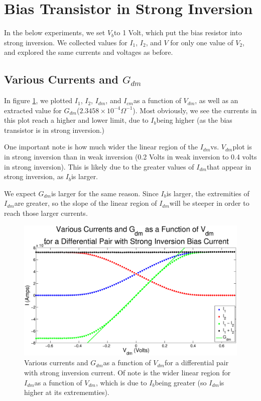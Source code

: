 \documentclass{article}
\newcommand{\Vb}{{$V_{b}$}}
\newcommand{\Vtwo}{{$V_{2}$}}
\newcommand{\Itwo}{{$I_{2}$}}
\newcommand{\Ione}{{$I_{1}$}}
\newcommand{\gdm}{{$G_{dm}$}}
\newcommand{\Vdm}{{$V_{dm}$}}
\newcommand{\Idm}{{$I_{dm}$}}
\newcommand{\Icm}{{$I_{cm}$}}
\newcommand{\Ib}{{$I_{b}$}}
\begin{document}
\section*{Bias Transistor in Strong Inversion}

In the below experiments, we set \Vb to 1 Volt, which put the bias resistor into strong inversion. We collected values for \Ione, \Itwo, and $V$ for only one value of \Vtwo, and explored the same currents and voltages as before.

\subsection*{Various Currents and \gdm}

In figure \ref{fig:AllCurrentsStrongInversion}, we plotted \Ione, \Itwo, \Idm, and \Icm as a function of \Vdm, as well as an extracted value for \gdm ($2.3458 \times 10^{-4} \Omega^{-1}$). Most obviously, we see the currents in this plot reach a higher and lower limit, due to \Ib being higher (as the bias transistor is in strong inversion.)

One important note is how much wider the linear region of the \Idm vs. \Vdm plot is in strong inversion than in weak inversion (0.2 Volts in weak inversion to 0.4 volts in strong inversion). This is likely due to the greater values of \Idm that appear in strong inversion, as \Ib is larger.

We expect \gdm is larger for the same reason. Since \Ib is larger, the extremities of \Idm are greater, so the slope of the linear region of \Idm will be steeper in order to reach those larger currents.

\begin{figure}[H]
\centering
\includegraphics[width=\linewidth]{./Figures/AllCurrentsStrongInversion.eps}
\caption{Various currents and \gdm as a function of \Vdm for a differential pair with strong inversion current. Of note is the wider linear region for \Idm as a function of \Vdm, which is due to \Ib being greater (so \Idm is higher at its extrememties).}
\label{fig:AllCurrentsStrongInversion}
\end{figure}
\end{document}
